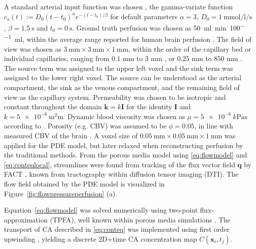 \documentclass[journal,twocolumn]{IEEEtran}
\newcommand{\ca}{c_\mathrm{a}}
\newcommand{\vq}{\mathbf{q}}
\newcommand{\simu}{k\pascal\second}
\newcommand{\siPml}{\milli\litre\per\minute\per100\milli\litre}
\begin{document}
	A standard arterial input function was chosen \cite{ostergaard96}, the gamma-variate function $\ca(t) := D_0(t-t_0)^\alpha e^{-(t-t_0)/\beta}$ for default parameters $\alpha=3$, $D_0 = \SI{1}{\milli\mol\per\litre\per\second}$, $\beta = \SI{1.5}{\second}$ and $t_0 = \SI{0}{\second}$.
	Ground truth perfusion was chosen as \SI{50}{\siPml}, within the average range reported for human brain perfusion \cite{Obrist1984,Smith00}. The field of view was chosen as $\SI{3}{\milli\meter}\times\SI{3}{\milli\meter}\times\SI{1}{\milli\meter}$, within the order of the capillary bed or individual capillaries, ranging from $0.1$ mm to $3$ mm \cite{Cho2011}, or $0.25$ mm to $850$ mm \cite{Townsley2012}.
	The source term was assigned to the upper left voxel and the sink term was assigned to the lower right voxel. The source can be understood as the arterial compartment, the sink as the venous compartment, and the remaining field of view as the capillary system. 
	Permeability was chosen to be isotropic and constant throughout the domain $\mathbf{k}=k\mathbf{I}$ for the identity $\mathbf{I}$ and $k=\SI{5e-6}{\square\milli\meter}$.
	Dynamic blood viscosity was chosen as $\mu=\SI{5e-6}{\simu}$ according to \cite{rosencranz06}.
	Porosity (e.g. CBV) was assumed to be $\phi = 0.05$, in line with measured CBV of the brain \cite{Smith00}.
A voxel size of $\SI{0.05}{\milli\meter} \times\SI{0.05}{\milli\meter}\times\SI{1}{\milli\meter}$ was applied for the PDE model, but later relaxed when reconstructing perfusion by the traditional methods. From the porous media model using \eqref{eq:flowmodel} and \eqref{eq:conteqlocal}, streamlines were found from tracking of the flux vector field $\vq$ by FACT \cite{Mori1998}, known from  tractography within diffusion tensor imaging (DTI). 
	The flow field obtained by the PDE model is visualized in Figure~\ref{fig:flowpressureperfusion} (a).

	Equation~\eqref{eq:flowmodel} was solved numerically using two-point flux-approximation (TPFA), well known within porous media simulations \cite{Aarnes2007}.
	The transport of CA described in \eqref{eq:conteq} was implemented using first order upwinding \cite{Patankar80}, yielding a discrete 2D+time CA concentration map $C(\mathbf{x}_i,t_j)$.
\end{document}
